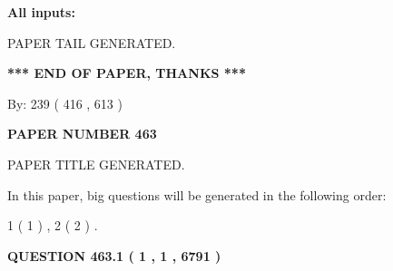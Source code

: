 \documentclass[12pt]{article}
\begin{document}
   
   
   
\noindent{}
   
   
   
   
\noindent\vspace{0.1in}\hspace{-0.08in} {\textbf{\Large{All inputs: }}}
   
   
   
   
   
   
 \vspace{0.2in}
 
   
   
\vspace{2.0in} PAPER TAIL GENERATED.
   
   
   
   
\vspace{1.0in} 
{\textbf{\large{ *** END OF PAPER, THANKS *** }}} 
   
   
\hspace{1.0in} By: 
 239 ( 416 ,  613 )
   
   
   
   
\newpage 
\setcounter{page}{ 
   463001 } 
   
   
   
   
 {\textbf{ \Large{ PAPER NUMBER  463  }}}
   
   
\vspace{0.2in}
   
   
   
   
   
   
   
   
 \vspace{0.2in}
 
 
 
 
   
   
 PAPER TITLE GENERATED.
   
   
   
\vspace{0.2in}
   
In this paper, big questions will be generated in the following order: 
   
   
   1 ( 1 )
 ,
   2 ( 2 )
 .
  
\vspace{0.2in}
  
{\textbf{\Large{QUESTION
463.1 
 ( 1 , 1 , 6791 )
}}}
  
\end{document}
